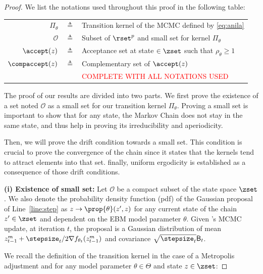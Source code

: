 \documentclass[10pt,twocolumn,letterpaper]{article}
\begin{document}
\begin{proof}



We list the notations used throughout this proof in the following table:

\begin{table}[htbp]
\begin{tabular}{r c p{17cm} }
\toprule
$\Pi_\theta$ & $\triangleq$ &  Transition kernel of the MCMC defined by \eqref{eq:anila}\\
$\mathcal{O}$ & $\triangleq$ & Subset of $\rset^p$ and small set for kernel $\Pi_\theta$\\
$\accept(z)$ & $\triangleq$ & Acceptance set at state $ \in \zset$ such that $\rho_\theta \geq 1$ \\
$\compaccept(z)$ & $\triangleq$ & Complementary set of  $\accept(z)$\\
& & \textcolor{red}{COMPLETE WITH ALL NOTATIONS USED}\\
\bottomrule
\end{tabular}
\label{tab:notations}
\end{table}



The proof of our results are divided into two parts.
We first prove the existence of a set noted $\mathcal{O}$ as a small set for our transition kernel $\Pi_\theta$.
Proving a small set is important to show that for any state, the Markov Chain does not stay in the same state, and thus help in proving its irreducibility and aperiodicity.

Then, we will prove the drift condition towards a small set.
This condition is crucial to prove the convergence of the chain since it states that the kernels tend to attract elements into that set. 
finally, uniform ergodicity is established as a consequence of those drift conditions.

\medskip
\noindent \textbf{(i) Existence of small set: }
Let $\mathcal{O}$ be a compact subset of the state space $\zset$.
We also denote the probability density function (pdf) of the Gaussian proposal of Line~\ref{line:step} as $z \to \prop{\theta}(z',z)$ for any current state of the chain $z' \in \zset$ and dependent on the EBM model parameter $\theta$.
Given \algo's MCMC update, at iteration $t$, the proposal is a Gaussian distribution of mean $z_{t-1}^m+ \stepsize_t/2  \nabla f_{\theta_t}(z_{t-1}^m)$ and covariance $\sqrt{\stepsize_t} \mathsf{B}_t$.

We recall the definition of the transition kernel in the case of a Metropolis adjustment and for any model parameter $\theta \in \Theta$ and state $z \in \zset$:


\end{proof}
\end{document}
